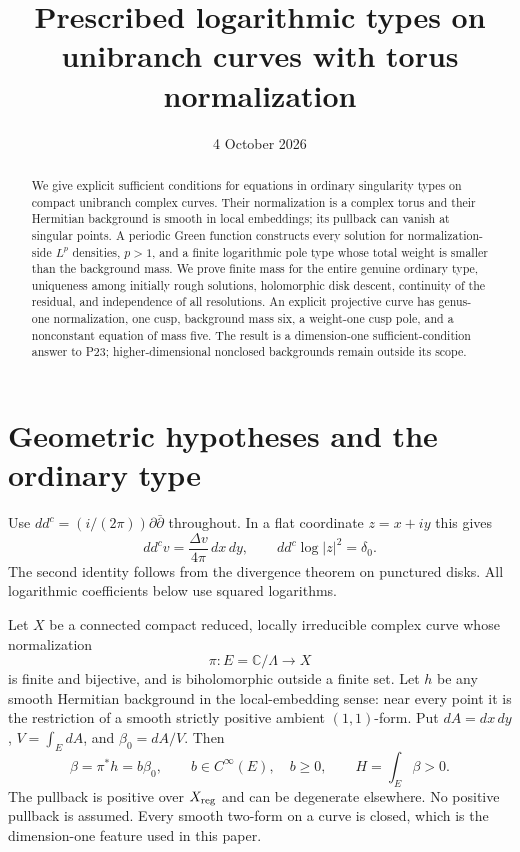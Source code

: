 \documentclass[11pt]{article}
\title{Prescribed logarithmic types on unibranch curves with torus normalization}
\author{}
\date{4 October 2026}
\newcommand{\ddc}{dd^c}
\newcommand{\C}{\mathbb C}
\begin{document}
\maketitle
\begin{abstract}
We give explicit sufficient conditions for equations in ordinary
singularity types on compact unibranch complex curves. Their normalization
is a complex torus and their Hermitian background is smooth in local
embeddings; its pullback can vanish at singular points. A periodic Green
function constructs every solution for normalization-side $L^p$ densities,
$p>1$, and a finite logarithmic pole type whose total weight is smaller
than the background mass. We prove finite mass for the entire genuine
ordinary type, uniqueness among initially rough solutions, holomorphic
disk descent, continuity of the residual, and independence of all
resolutions. An explicit projective curve has genus-one normalization,
one cusp, background mass six, a weight-one cusp pole, and a nonconstant equation
of mass five. The result is a dimension-one sufficient-condition answer
to P23; higher-dimensional nonclosed backgrounds remain outside its scope.
\end{abstract}

\section{Geometric hypotheses and the ordinary type}
Use $\ddc=(i/(2\pi))\partial\bar\partial$ throughout. In a flat
coordinate $z=x+iy$ this gives
\begin{equation}\label{eq:normalization}
 \ddc v=\frac{\Delta v}{4\pi}\,dx\,dy,
 \qquad \ddc\log|z|^2=\delta_0.
\end{equation}
The second identity follows from the divergence theorem on punctured
disks. All logarithmic coefficients below use squared logarithms.

Let $X$ be a connected compact reduced, locally irreducible complex
curve whose normalization
\[
 \pi:E=\C/\Lambda\longrightarrow X
\]
is finite and bijective, and is biholomorphic outside a finite set.
Let $h$ be any smooth Hermitian background in the local-embedding sense:
near every point it is the restriction of a smooth strictly positive
ambient $(1,1)$-form. Put $dA=dx\,dy$, $V=\int_EdA$, and
$\beta_0=dA/V$. Then
\[
 \beta=\pi^*h=b\beta_0,\qquad b\in C^\infty(E),\quad b\geq0,
 \qquad H=\int_E\beta>0.
\]
The pullback is positive over $X_{\rm reg}$ and can be degenerate elsewhere.
No positive pullback is assumed. Every smooth two-form on a curve is
closed, which is the dimension-one feature used in this paper.
\end{document}
